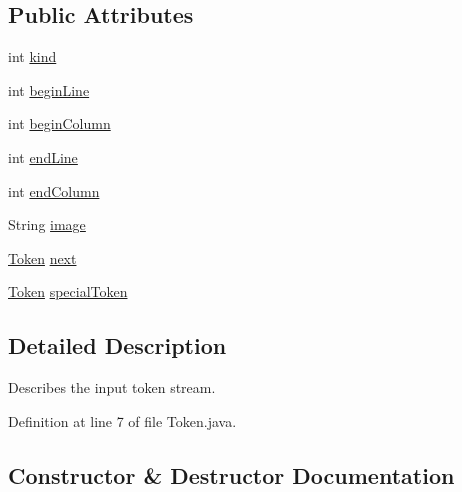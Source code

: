 \subsection*{Public Attributes}
\begin{DoxyCompactItemize}
\item 
int \mbox{\hyperlink{classorg_1_1tec_1_1comp_1_1interpreter_1_1_token_a94909210d1760411e4901243abdb4fc2}{kind}}
\item 
int \mbox{\hyperlink{classorg_1_1tec_1_1comp_1_1interpreter_1_1_token_a0bc93f1911779e85bcd851a086d16c61}{begin\+Line}}
\item 
int \mbox{\hyperlink{classorg_1_1tec_1_1comp_1_1interpreter_1_1_token_a4477915d17fec02b320c93fb1ca5dc8c}{begin\+Column}}
\item 
int \mbox{\hyperlink{classorg_1_1tec_1_1comp_1_1interpreter_1_1_token_a455acf1cd797bc6ea234f69ac00ad271}{end\+Line}}
\item 
int \mbox{\hyperlink{classorg_1_1tec_1_1comp_1_1interpreter_1_1_token_ae7942e283d41456d4f803e1334d7c9a7}{end\+Column}}
\item 
String \mbox{\hyperlink{classorg_1_1tec_1_1comp_1_1interpreter_1_1_token_a19f4df05af50682f05314b00c906a0ff}{image}}
\item 
\mbox{\hyperlink{classorg_1_1tec_1_1comp_1_1interpreter_1_1_token}{Token}} \mbox{\hyperlink{classorg_1_1tec_1_1comp_1_1interpreter_1_1_token_a44b635649771157f9cbc2a2481b1279a}{next}}
\item 
\mbox{\hyperlink{classorg_1_1tec_1_1comp_1_1interpreter_1_1_token}{Token}} \mbox{\hyperlink{classorg_1_1tec_1_1comp_1_1interpreter_1_1_token_afdd78d6313c00d7ed575e368db5e10aa}{special\+Token}}
\end{DoxyCompactItemize}


\subsection{Detailed Description}
Describes the input token stream. 

Definition at line 7 of file Token.\+java.



\subsection{Constructor \& Destructor Documentation}
\mbox{\label{classorg_1_1tec_1_1comp_1_1interpreter_1_1_token_a14d0d767b5afa4ac4b55e2fbed415ded}} 
